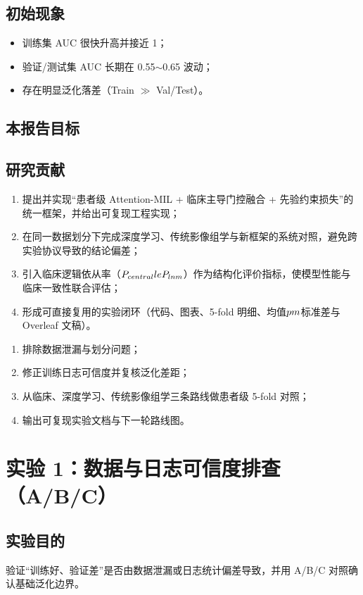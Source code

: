 \documentclass[12pt,a4paper]{ctexart}
\begin{document}
\subsection{初始现象}
\begin{itemize}
  \item 训练集 AUC 很快升高并接近 1；
  \item 验证/测试集 AUC 长期在 0.55$\sim$0.65 波动；
  \item 存在明显泛化落差（Train $\gg$ Val/Test）。
\end{itemize}

\subsection{本报告目标}
\subsection{研究贡献}
\begin{enumerate}
  \item 提出并实现“患者级 Attention-MIL + 临床主导门控融合 + 先验约束损失”的统一框架，并给出可复现工程实现；
  \item 在同一数据划分下完成深度学习、传统影像组学与新框架的系统对照，避免跨实验协议导致的结论偏差；
  \item 引入临床逻辑依从率（$P_{central}\\le P_{lnm}$）作为结构化评价指标，使模型性能与临床一致性联合评估；
  \item 形成可直接复用的实验闭环（代码、图表、5-fold 明细、均值$\\pm$标准差与 Overleaf 文稿）。
\end{enumerate}

\begin{enumerate}
  \item 排除数据泄漏与划分问题；
  \item 修正训练日志可信度并复核泛化差距；
  \item 从临床、深度学习、传统影像组学三条路线做患者级 5-fold 对照；
  \item 输出可复现实验文档与下一轮路线图。
\end{enumerate}

\section{实验 1：数据与日志可信度排查（A/B/C）}

\subsection{实验目的}
验证“训练好、验证差”是否由数据泄漏或日志统计偏差导致，并用 A/B/C 对照确认基础泛化边界。
\end{document}
